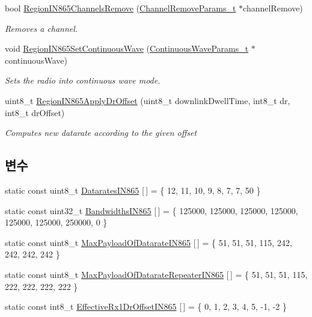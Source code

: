 \begin{DoxyCompactItemize}
bool \mbox{\hyperlink{group___r_e_g_i_o_n_i_n865_ga06a432cedafb503d6e75757bc7d7e1b0}{Region\+I\+N865\+Channels\+Remove}} (\mbox{\hyperlink{group___r_e_g_i_o_n_gaa37468560d2fc81a977b57a48e5d72c0}{Channel\+Remove\+Params\+\_\+t}} $\ast$channel\+Remove)
\begin{DoxyCompactList}\small\item\em Removes a channel. \end{DoxyCompactList}\item 
void \mbox{\hyperlink{group___r_e_g_i_o_n_i_n865_gaf8fbc63e4fc4b21a4c69755c1750f194}{Region\+I\+N865\+Set\+Continuous\+Wave}} (\mbox{\hyperlink{group___r_e_g_i_o_n_gaf39bb5ba06921139c6d17f88a8d518cd}{Continuous\+Wave\+Params\+\_\+t}} $\ast$continuous\+Wave)
\begin{DoxyCompactList}\small\item\em Sets the radio into continuous wave mode. \end{DoxyCompactList}\item 
uint8\+\_\+t \mbox{\hyperlink{group___r_e_g_i_o_n_i_n865_ga19226aa295c5ee39d802b597884ece86}{Region\+I\+N865\+Apply\+Dr\+Offset}} (uint8\+\_\+t downlink\+Dwell\+Time, int8\+\_\+t dr, int8\+\_\+t dr\+Offset)
\begin{DoxyCompactList}\small\item\em Computes new datarate according to the given offset \end{DoxyCompactList}\end{DoxyCompactItemize}
\subsection*{변수}
\begin{DoxyCompactItemize}
\item 
static const uint8\+\_\+t \mbox{\hyperlink{group___r_e_g_i_o_n_i_n865_gab75afc0ef0f385b2d600104b8c878015}{Datarates\+I\+N865}} \mbox{[}$\,$\mbox{]} = \{ 12, 11, 10, 9, 8, 7, 7, 50 \}
\item 
static const uint32\+\_\+t \mbox{\hyperlink{group___r_e_g_i_o_n_i_n865_ga475d37a30ba7948399a698e9ed6b8dc1}{Bandwidths\+I\+N865}} \mbox{[}$\,$\mbox{]} = \{ 125000, 125000, 125000, 125000, 125000, 125000, 250000, 0 \}
\item 
static const uint8\+\_\+t \mbox{\hyperlink{group___r_e_g_i_o_n_i_n865_ga4729e4e34b8d7776f836a928e12f81b9}{Max\+Payload\+Of\+Datarate\+I\+N865}} \mbox{[}$\,$\mbox{]} = \{ 51, 51, 51, 115, 242, 242, 242, 242 \}
\item 
static const uint8\+\_\+t \mbox{\hyperlink{group___r_e_g_i_o_n_i_n865_gaee3f7b88b358429d13b4e4dc8f913b47}{Max\+Payload\+Of\+Datarate\+Repeater\+I\+N865}} \mbox{[}$\,$\mbox{]} = \{ 51, 51, 51, 115, 222, 222, 222, 222 \}
\item 
static const int8\+\_\+t \mbox{\hyperlink{group___r_e_g_i_o_n_i_n865_ga3ea78d4c103e6cb89a5a573b0a3ae946}{Effective\+Rx1\+Dr\+Offset\+I\+N865}} \mbox{[}$\,$\mbox{]} = \{ 0, 1, 2, 3, 4, 5, -\/1, -\/2 \}
\end{DoxyCompactItemize}


